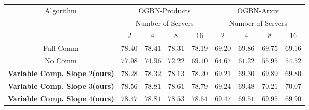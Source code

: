 \begin{table*}
\centering
	\begin{tabular}{c|cccc|cccc}
		\hline
		\multirow{3}{*}{Algorithm}    & \multicolumn{4}{c|}{OGBN-Products}                                                                   & \multicolumn{4}{c}{OGBN-Arxiv}                                                                      \\ \cline{2-9} 
		& \multicolumn{4}{c}{Number of Servers}                                                               & \multicolumn{4}{c}{Number of Servers}                                                               \\ \cline{2-9} 
		& \multicolumn{1}{c|}{$2$}     & \multicolumn{1}{c|}{$4$}     & \multicolumn{1}{c|}{$8$}     & $16$    & \multicolumn{1}{c|}{$2$}     & \multicolumn{1}{c|}{$4$}     & \multicolumn{1}{c|}{$8$}     & $16$    \\ \hline
Full Comm& \multicolumn{1}{c|}{$78.40$} & \multicolumn{1}{c|}{$78.41$} & \multicolumn{1}{c|}{$78.31$} & \multicolumn{1}{c|}{$78.19$} & \multicolumn{1}{c|}{$69.20$} & \multicolumn{1}{c|}{$69.86$} & \multicolumn{1}{c|}{$69.75$} & \multicolumn{1}{c}{$69.16$} \\ \hline
No Comm& \multicolumn{1}{c|}{$77.08$} & \multicolumn{1}{c|}{$74.96$} & \multicolumn{1}{c|}{$72.22$} & \multicolumn{1}{c|}{$69.10$} & \multicolumn{1}{c|}{$64.67$} & \multicolumn{1}{c|}{$61.22$} & \multicolumn{1}{c|}{$55.95$} & \multicolumn{1}{c}{$54.52$} \\ \hline
\textbf{Variable Comp. Slope $2$(ours)}& \multicolumn{1}{c|}{$78.28$} & \multicolumn{1}{c|}{$78.32$} & \multicolumn{1}{c|}{$78.13$} & \multicolumn{1}{c|}{$78.20$} & \multicolumn{1}{c|}{$69.21$} & \multicolumn{1}{c|}{$69.30$} & \multicolumn{1}{c|}{$69.89$} & \multicolumn{1}{c}{$69.80$} \\ \hline
\textbf{Variable Comp. Slope $3$(ours)}& \multicolumn{1}{c|}{$78.56$} & \multicolumn{1}{c|}{$78.81$} & \multicolumn{1}{c|}{$78.61$} & \multicolumn{1}{c|}{$78.79$} & \multicolumn{1}{c|}{$69.24$} & \multicolumn{1}{c|}{$69.48$} & \multicolumn{1}{c|}{$70.21$} & \multicolumn{1}{c}{$70.07$} \\ \hline
\textbf{Variable Comp. Slope $4$(ours)}& \multicolumn{1}{c|}{$78.47$} & \multicolumn{1}{c|}{$78.81$} & \multicolumn{1}{c|}{$78.53$} & \multicolumn{1}{c|}{$78.64$} & \multicolumn{1}{c|}{$69.47$} & \multicolumn{1}{c|}{$69.51$} & \multicolumn{1}{c|}{$69.95$} & \multicolumn{1}{c}{$69.90$} \\ \hline

\end{tabular}
\end{table*}
